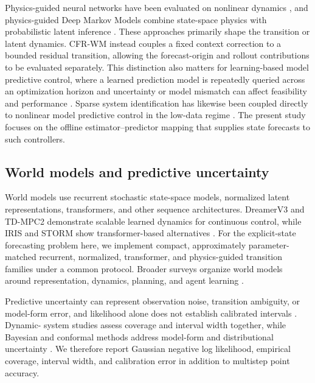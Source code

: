 Physics-guided neural networks have been evaluated on nonlinear dynamics
\cite{robinson2022_physics_guided_neural_networks_for}, and physics-guided Deep
Markov Models combine state-space physics with probabilistic latent inference
\cite{liu2022_physics_guided_deep_markov_models}. These approaches primarily
shape the transition or latent dynamics. CFR-WM instead couples a fixed context
correction to a bounded residual transition, allowing the forecast-origin and
rollout contributions to be evaluated separately. This distinction also
matters for learning-based model predictive control, where a learned prediction
model is repeatedly queried across an optimization horizon and uncertainty or
model mismatch can affect feasibility and performance
\cite{hewing2020_learning_mpc}. Sparse system identification has likewise been
coupled directly to nonlinear model predictive control in the low-data regime
\cite{kaiser2018_sindy_mpc}. The present study focuses on the offline
estimator--predictor mapping that supplies state forecasts to such controllers.

\subsection{World models and predictive uncertainty}

World models use recurrent stochastic state-space models, normalized latent
representations, transformers, and other sequence architectures. DreamerV3 and
TD-MPC2 demonstrate scalable learned dynamics for continuous control, while
IRIS and STORM show transformer-based alternatives
\cite{hafner2025_mastering_diverse_control_tasks_through,hansen2023_td_mpc2_scalable_robust_world,micheli2022_transformers_are_sample_efficient_world,zhang2023_storm_efficient_stochastic_transformer_based}.
For the explicit-state forecasting problem here, we implement compact,
approximately parameter-matched recurrent, normalized, transformer, and
physics-guided transition families under a common protocol. Broader surveys
organize world models around representation, dynamics, planning, and agent
learning \cite{ding2025_understanding_world_or_predicting_future}.

Predictive uncertainty can represent observation noise, transition ambiguity,
or model-form error, and likelihood alone does not establish calibrated
intervals \cite{abdar2021_a_review_of_uncertainty_quantification}. Dynamic-
system studies assess coverage and interval width together, while Bayesian and
conformal methods address model-form and distributional uncertainty
\cite{klotz2022_uncertainty_estimation_with_deep_learning,ramancha2022_accounting_for_model_form_uncertainty,portela2025_conformal_prediction_for_uncertainty_quantification}.
We therefore report Gaussian negative log likelihood, empirical coverage,
interval width, and calibration error in addition to multistep point accuracy.
